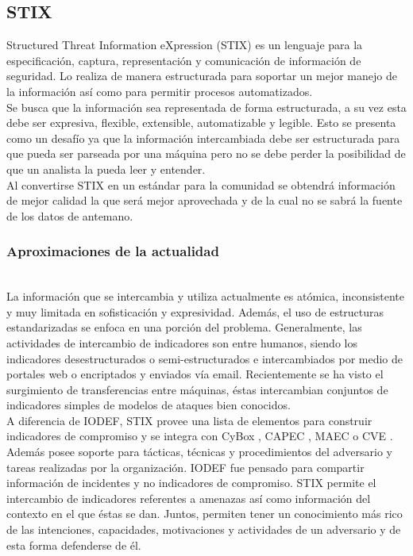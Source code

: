\subsection{STIX}

Structured Threat Information eXpression (STIX) es un lenguaje para la especificación, captura, representación y 
comunicación de información de seguridad. Lo realiza de manera 
estructurada para soportar un mejor manejo de la información así como para 
permitir procesos automatizados.\\

Se busca que la información sea representada de forma estructurada, a su vez 
esta debe ser expresiva, flexible, extensible, automatizable y legible. Esto se 
presenta como un desafío ya que la información intercambiada debe ser 
estructurada para que pueda ser parseada por una máquina pero no se debe perder 
la posibilidad de que un analista la pueda leer y entender.\\

Al convertirse STIX en un estándar para la comunidad se obtendrá información de 
mejor calidad la que será mejor aprovechada y de la cual no se sabrá la fuente 
de los datos de antemano.

\subsubsection{Aproximaciones de la actualidad}\ \\

La información que se intercambia y utiliza actualmente es atómica, inconsistente 
y muy limitada en sofisticación y expresividad. Además, el uso de estructuras 
estandarizadas se enfoca en una porción del problema. %
Generalmente, las actividades de intercambio de indicadores son entre humanos, 
siendo los indicadores desestructurados o semi-estructurados e intercambiados 
por medio de portales web o encriptados y enviados vía email. Recientemente se 
ha visto el surgimiento de transferencias entre máquinas, éstas intercambian 
conjuntos de indicadores simples de modelos de ataques bien conocidos.\\

A diferencia de IODEF, STIX provee una lista de elementos para construir 
indicadores de compromiso y se integra con CyBox \cite{cybox}, CAPEC \cite{capec}, MAEC \cite{maec} o CVE \cite{cve}. Además posee 
soporte para tácticas, técnicas y procedimientos del adversario y tareas 
realizadas por la organización. IODEF fue pensado para compartir información de 
incidentes y no indicadores de compromiso. STIX permite el intercambio de 
indicadores referentes a amenazas así como información del contexto en el que 
éstas se dan. Juntos, permiten tener un conocimiento más rico de las 
intenciones, capacidades, motivaciones y actividades de un adversario y de esta 
forma defenderse de él.\\

